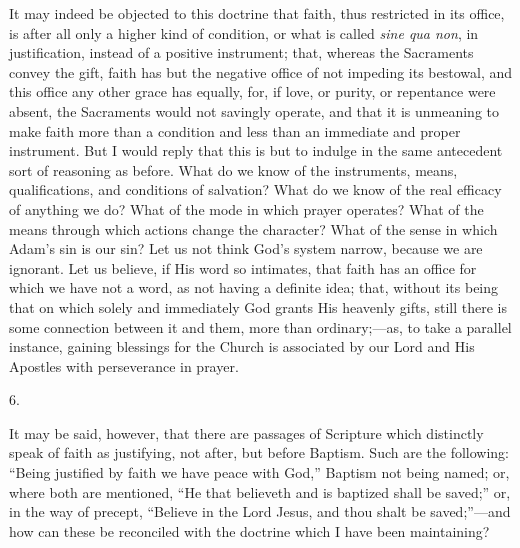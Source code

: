 It may indeed be objected to this doctrine that faith, thus
restricted in its office, is after all only a higher kind of
condition, or what is called \emph{sine qua non}, in justification,
instead of a positive instrument; that, whereas the Sacraments convey
the gift, faith has but the negative office of not impeding its
bestowal, and this office any other grace has equally, for, if love,
or purity, or repentance were absent, the Sacraments would not
savingly operate, and that it is unmeaning to make faith more than a
condition and less than an immediate and proper instrument. But I
would reply that this is but to indulge in the same antecedent sort of
reasoning as before. What do we know of the instruments, means,
qualifications, and conditions of salvation? What do we know of the
real efficacy of anything we do? What of the mode in which prayer
operates? What of the means through which actions change the
character? What of the sense in which Adam's sin is our sin? Let us
not think God's system narrow, because we are ignorant. Let us
believe, if His word so intimates, that faith has an office for which
we have not a word, as not having a definite idea; that, without its
being that on which solely and immediately God grants His heavenly
gifts, still there is some connection between it and them, more than
ordinary;—as, to take a parallel instance, gaining blessings for the
Church is associated by our Lord and His Apostles with perseverance in
prayer.

6.

It may be said, however, that there are passages of Scripture which
distinctly speak of faith as justifying, not after, but before
Baptism. Such are the following: ``Being justified by faith we
have peace with God,'' Baptism not being named; or, where both are
mentioned, ``He that believeth and is baptized shall be
saved;'' or, in the way of precept, ``Believe in the Lord
Jesus, and thou shalt be saved;''—and how can these be
reconciled with the doctrine which I have been maintaining?

